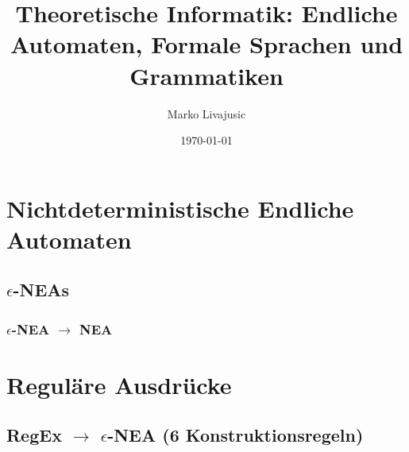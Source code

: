 \documentclass[12pt, oneside]{book}
\author{Marko Livajusic}
\date{\today}
\title{Theoretische Informatik: Endliche Automaten, Formale Sprachen und Grammatiken}
\begin{document}
\maketitle
\tableofcontents
\cleardoublepage




\chapter{Nichtdeterministische Endliche Automaten}
\section{$\epsilon$-NEAs}
\subsection{$\epsilon$-NEA $\rightarrow$ NEA}




\chapter{Reguläre Ausdrücke}
\section{RegEx $\rightarrow$ $\epsilon$-NEA (6 Konstruktionsregeln)}
\end{document}
